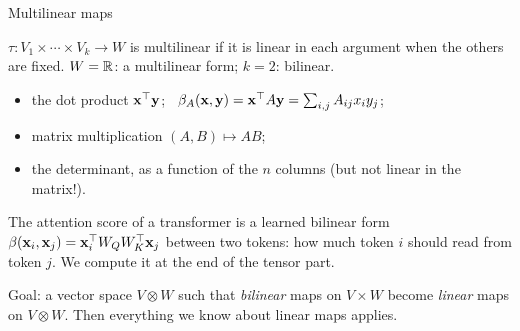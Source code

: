 \documentclass[aspectratio=1610,11pt]{beamer}
\begin{document}


\begin{frame}{Multilinear maps}
    \begin{definition}
        \small $\tau: V_1 \times \cdots \times V_k \to W$ is multilinear if it is linear in each argument when the others are fixed. $W = \mathbb{R}$: a multilinear form; $k = 2$: bilinear.
    \end{definition}
    \begin{example}[][ex:multilinear]
        \small
        \begin{itemize}
            \item the dot product $\mathbf{x}^\top\mathbf{y}$; \ $\beta_A(\mathbf{x}, \mathbf{y}) = \mathbf{x}^\top A\mathbf{y} = \sum_{i,j}A_{ij}x_iy_j$;
            \item matrix multiplication $(A, B) \mapsto AB$;
            \item the determinant, as a function of the $n$ columns (but not linear in the matrix!).
        \end{itemize}
    \end{example}
    \begin{mlbox}
        \small The attention score of a transformer is a learned bilinear form $\beta(\mathbf{x}_i, \mathbf{x}_j) = \mathbf{x}_i^\top W_QW_K^\top\mathbf{x}_j$ between two tokens: how much token $i$ should read from token $j$. We compute it at the end of the tensor part.
    \end{mlbox}
    \small
    Goal: a vector space $V \otimes W$ such that \emph{bilinear} maps on $V \times W$ become \emph{linear} maps on $V \otimes W$. Then everything we know about linear maps applies.
\end{frame}
\end{document}
